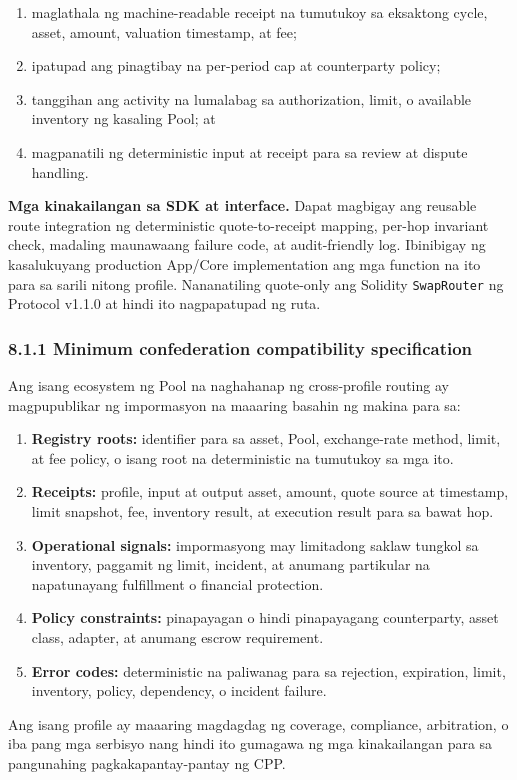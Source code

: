 \documentclass[11pt]{article}
\begin{document}
\begin{enumerate}[leftmargin=*]
\item maglathala ng machine-readable receipt na tumutukoy sa eksaktong cycle, asset, amount, valuation timestamp, at fee;
\item ipatupad ang pinagtibay na per-period cap at counterparty policy;
\item tanggihan ang activity na lumalabag sa authorization, limit, o available inventory ng kasaling Pool; at
\item magpanatili ng deterministic input at receipt para sa review at dispute handling.
\end{enumerate}
\textbf{Mga kinakailangan sa SDK at interface.} Dapat magbigay ang reusable route integration ng deterministic quote-to-receipt mapping, per-hop invariant check, madaling maunawaang failure code, at audit-friendly log. Ibinibigay ng kasalukuyang production App/Core implementation ang mga function na ito para sa sarili nitong profile. Nananatiling quote-only ang Solidity \texttt{SwapRouter} ng Protocol v1.1.0 at hindi ito nagpapatupad ng ruta.

\subsubsection*{8.1.1 Minimum confederation compatibility specification}

Ang isang ecosystem ng Pool na naghahanap ng cross-profile routing ay magpupublikar ng impormasyon na maaaring basahin ng makina para sa:

\begin{enumerate}[leftmargin=*]
\item \textbf{Registry roots:} identifier para sa asset, Pool, exchange-rate method, limit, at fee policy, o isang root na deterministic na tumutukoy sa mga ito.
\item \textbf{Receipts:} profile, input at output asset, amount, quote source at timestamp, limit snapshot, fee, inventory result, at execution result para sa bawat hop.
\item \textbf{Operational signals:} impormasyong may limitadong saklaw tungkol sa inventory, paggamit ng limit, incident, at anumang partikular na napatunayang fulfillment o financial protection.
\item \textbf{Policy constraints:} pinapayagan o hindi pinapayagang counterparty, asset class, adapter, at anumang escrow requirement.
\item \textbf{Error codes:} deterministic na paliwanag para sa rejection, expiration, limit, inventory, policy, dependency, o incident failure.
\end{enumerate}
Ang isang profile ay maaaring magdagdag ng coverage, compliance, arbitration, o iba pang mga serbisyo nang hindi ito gumagawa ng mga kinakailangan para sa pangunahing pagkakapantay-pantay ng CPP.
\end{document}
